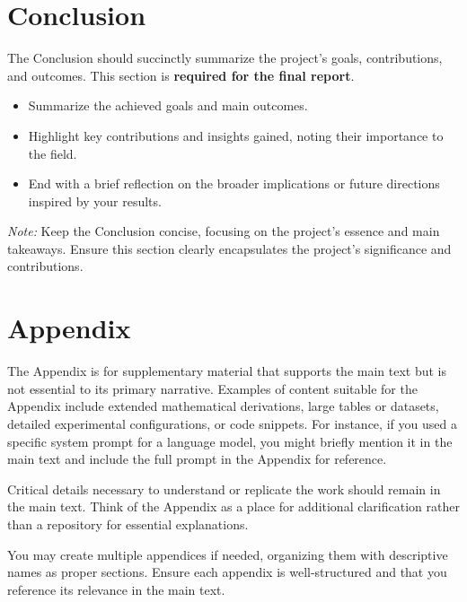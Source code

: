 \documentclass{article}
\begin{document}
\section{Conclusion}

The Conclusion should succinctly summarize the project's goals, contributions, and outcomes. This section is \textbf{required for the final report}.

\begin{itemize}
    \item Summarize the achieved goals and main outcomes.
    \item Highlight key contributions and insights gained, noting their importance to the field.
    \item End with a brief reflection on the broader implications or future directions inspired by your results.
\end{itemize}

\textit{Note:} Keep the Conclusion concise, focusing on the project's essence and main takeaways. Ensure this section clearly encapsulates the project's significance and contributions.




\appendix

\section{Appendix}

The Appendix is for supplementary material that supports the main text but is not essential to its primary narrative. Examples of content suitable for the Appendix include extended mathematical derivations, large tables or datasets, detailed experimental configurations, or code snippets. For instance, if you used a specific system prompt for a language model, you might briefly mention it in the main text and include the full prompt in the Appendix for reference.

Critical details necessary to understand or replicate the work should remain in the main text. Think of the Appendix as a place for additional clarification rather than a repository for essential explanations.

You may create multiple appendices if needed, organizing them with descriptive names as proper sections. Ensure each appendix is well-structured and that you reference its relevance in the main text.


\end{document}
